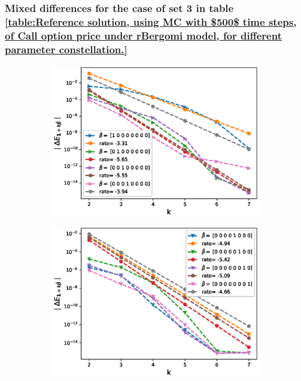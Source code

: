 \documentclass[11pt]{article}
\begin{document}
\subsubsection{Mixed differences for the case of set 3 in table \ref{table:Reference solution, using MC with $500$ time steps, of Call option price under rBergomi model, for different parameter constellation.}}\label{Mixed differences for the case of set 3}
\begin{figure}[h!]
	\centering
	\begin{subfigure}{.4\textwidth}
		\centering
		\includegraphics[width=1\linewidth]{./figures/rBergomi_mixed_error_rates/without_change_measure/N_4/H_007/first_difference_rbergomi_4steps_H_007_K_08_totally_hierarch_with_rate_W1}
		\caption{}
		\label{fig:sub3}
	\end{subfigure}%
	\begin{subfigure}{.4\textwidth}
		\centering
		\includegraphics[width=1\linewidth]{./figures/rBergomi_mixed_error_rates/without_change_measure/N_4/H_007/first_difference_rbergomi_4steps_H_007_K_08_totally_hierarch_with_rate_W2}
		\caption{}
		\label{fig:sub4}
	\end{subfigure}
	

\end{figure}
\end{document}
